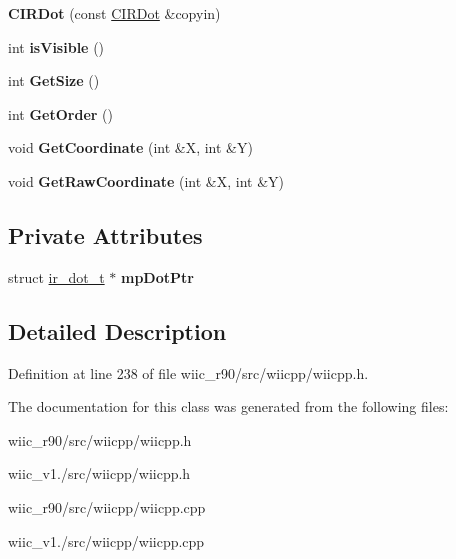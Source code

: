 \begin{DoxyCompactItemize}
\item 
\hypertarget{class_c_i_r_dot_abed3b30052805bc25e54dacec11f35a8}{{\bfseries C\-I\-R\-Dot} (const \hyperlink{class_c_i_r_dot}{C\-I\-R\-Dot} \&copyin)}\label{class_c_i_r_dot_abed3b30052805bc25e54dacec11f35a8}

\item 
\hypertarget{class_c_i_r_dot_a52d88e14f8b1926faefb3c7ae3392a81}{int {\bfseries is\-Visible} ()}\label{class_c_i_r_dot_a52d88e14f8b1926faefb3c7ae3392a81}

\item 
\hypertarget{class_c_i_r_dot_a55d84ee46d123c4cee2d5972f3416674}{int {\bfseries Get\-Size} ()}\label{class_c_i_r_dot_a55d84ee46d123c4cee2d5972f3416674}

\item 
\hypertarget{class_c_i_r_dot_a820ce87be176b3d2cf15f27b7fe60ee3}{int {\bfseries Get\-Order} ()}\label{class_c_i_r_dot_a820ce87be176b3d2cf15f27b7fe60ee3}

\item 
\hypertarget{class_c_i_r_dot_a1eee8cc3c7dcdb20c0e73792386bb215}{void {\bfseries Get\-Coordinate} (int \&X, int \&Y)}\label{class_c_i_r_dot_a1eee8cc3c7dcdb20c0e73792386bb215}

\item 
\hypertarget{class_c_i_r_dot_aba4908bf9d66671639b8b767df162796}{void {\bfseries Get\-Raw\-Coordinate} (int \&X, int \&Y)}\label{class_c_i_r_dot_aba4908bf9d66671639b8b767df162796}

\end{DoxyCompactItemize}
\subsection*{Private Attributes}
\begin{DoxyCompactItemize}
\item 
\hypertarget{class_c_i_r_dot_a00e386ce0270870f9e1a96515c58e2dd}{struct \hyperlink{structir__dot__t}{ir\-\_\-dot\-\_\-t} $\ast$ {\bfseries mp\-Dot\-Ptr}}\label{class_c_i_r_dot_a00e386ce0270870f9e1a96515c58e2dd}

\end{DoxyCompactItemize}


\subsection{Detailed Description}


Definition at line 238 of file wiic\-\_\-r90/src/wiicpp/wiicpp.\-h.



The documentation for this class was generated from the following files\-:\begin{DoxyCompactItemize}
\item 
wiic\-\_\-r90/src/wiicpp/wiicpp.\-h\item 
wiic\-\_\-v1./src/wiicpp/wiicpp.\-h\item 
wiic\-\_\-r90/src/wiicpp/wiicpp.\-cpp\item 
wiic\-\_\-v1./src/wiicpp/wiicpp.\-cpp\end{DoxyCompactItemize}
